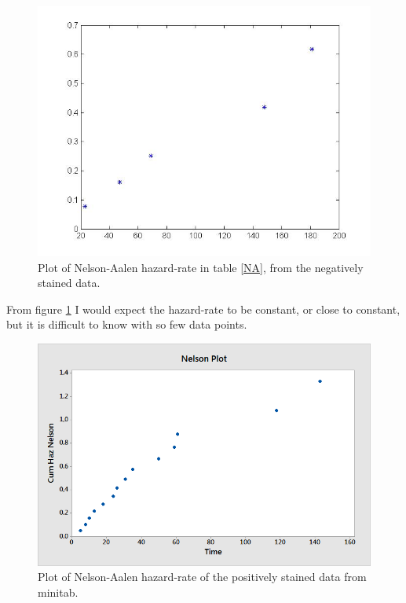 \documentclass[10pt, a4paper]{article}
\begin{document}
\begin{center}
\begin{figure}[h!]
\centering
\includegraphics[scale=0.50]{NA}
\caption{Plot of Nelson-Aalen hazard-rate in table \ref{NA}, from the negatively stained data.  }
\label{NAh}
\end{figure}
\end{center}
From figure \ref{NAh} I would expect the hazard-rate to be constant, or close to constant, but it is difficult to know with so few data points.

\begin{center}
\begin{figure}[h!]
\centering
\includegraphics[scale=0.75]{nelson2.png}
\caption{Plot of Nelson-Aalen hazard-rate of the positively stained data from minitab.  }
\label{NAm}
\end{figure}
\end{center}
\end{document}
